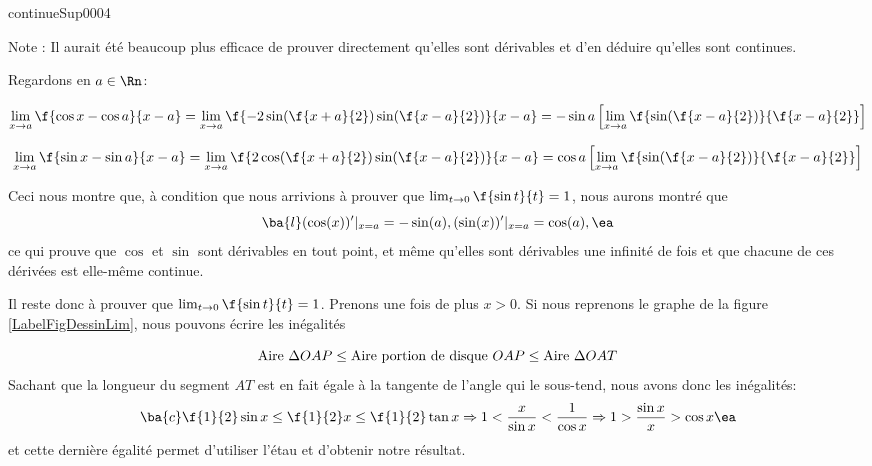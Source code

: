 \begin{corrige}{continueSup0004}
\begin{enumerate}
Note : Il aurait été beaucoup plus efficace  de prouver directement qu'elles sont dérivables et d'en déduire qu'elles sont continues.

Regardons en $a\in \Rn$: 

\[\lim_{x\rightarrow  a}\f{ \cos x  - \cos a}{x-a} = \lim_{x\rightarrow  a}\f{ -2\sin(\f{x+a}{2})\sin(\f{x-a}{2})}{x-a}\\
= -\sin a \left[  \lim_{x\rightarrow  a}\f{ \sin(\f{x-a}{2})}{\f{x-a}{2}}\right]\]


\[\lim_{x\rightarrow  a}\f{ \sin x  - \sin a}{x-a} = \lim_{x\rightarrow  a}\f{ 2\cos(\f{x+a}{2})\sin(\f{x-a}{2})}{x-a}\\
= \cos a \left[  \lim_{x\rightarrow  a}\f{ \sin(\f{x-a}{2})}{\f{x-a}{2}}\right]\]

Ceci nous montre que, à condition que nous arrivions à prouver que $\lim_{t\rightarrow  0} \f{\sin t}{t}=1$, nous aurons montré que 
\[
\ba{l} (\cos(x))'|_{x=a} = -\sin(a), \\ (\sin(x))'|_{x=a} = \cos(a),\ea
\]
 ce qui prouve que $\cos$ et $\sin$ sont dérivables en tout point, et même qu'elles sont dérivables une infinité de fois et que chacune de ces dérivées est elle-même continue. 

Il reste donc à prouver que $\lim_{t\rightarrow  0} \f{\sin t}{t}=1$. Prenons une fois de plus $x>0$. Si nous reprenons le graphe de la figure \ref{LabelFigDessinLim}, nous pouvons écrire les inégalités

\[ {\rm Aire \ }\Delta  OAP \leq {\rm Aire \  portion \  de \  disque \ } OAP \leq {\rm Aire \ }\Delta  OAT\] Sachant que la longueur du segment $AT$ est en fait égale à la tangente de l'angle qui le sous-tend, nous avons donc les inégalités:
\[\ba{c} \f{1}{2}\sin x \leq \f{1}{2} x\leq\f{1}{2} \tan x\\ \\
	  \Rightarrow 1 < \dfrac{x}{\sin x} < \dfrac{1}{\cos x} \\\\
	  \Rightarrow 1 > \dfrac{\sin x}{x} > \cos x\ea\]
	  et cette dernière égalité permet d'utiliser l'étau et d'obtenir notre résultat.	
	  
 \end{enumerate}

\end{corrige}
